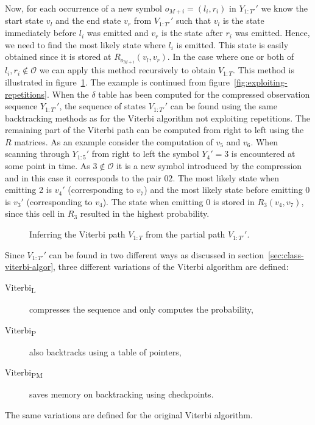 Now, for each occurrence of a new symbol $o_{M + i} = (l_i, r_i)$ in
$Y_{1:T'}'$ we know the start state $v_l$ and the end state $v_r$ from $V_{1:T'}'$
such that $v_l$ is the state immediately before $l_i$ was emitted and $v_r$ is
the state after $r_i$ was emitted. Hence, we need to find the most likely state
where $l_i$ is emitted. This state is easily obtained since it is stored at
$R_{o_{M + i}}(v_l, v_r)$. In the case where one or both of
$l_i, r_i \not \in \mathcal{O}$ we can apply this method recursively to obtain
$V_{1:T}$. This method is illustrated in
figure~\ref{fig:infering-viterbi-path}. The example is continued from
figure~\ref{fig:exploiting-repetitions}. When the $\delta$ table has been
computed for the compressed observation sequence $Y_{1:T'}'$, the sequence of
states $V_{1:T'}'$ can be found using the same backtracking methods as for the
Viterbi algorithm not exploiting repetitions. The remaining part of the Viterbi path can be
computed from right to left using the $R$ matrices. As an example consider the
computation of $v_5$ and $v_6$. When scanning through $Y_{1:5}'$ from right to
left the symbol $Y_4' = 3$ is encountered at some point in time. As
$3 \not \in \mathcal{O}$ it is a new symbol introduced by the compression and
in this case it corresponds to the pair $02$. The most likely state when
emitting 2 is $v_4'$ (corresponding to $v_7$) and the most likely state before
emitting 0 is $v_3'$ (corresponding to $v_4$). The state when emitting 0 is
stored in $R_3(v_4, v_7)$, since this cell in $R_3$ resulted in the highest
probability.

\begin{figure}
  \centering
  
  \caption{Inferring the Viterbi path $V_{1:T}$ from the partial path
    $V_{1:T'}'$. }
  \label{fig:infering-viterbi-path}
\end{figure}

Since $V_{1:T'}'$ can be found in two different ways as discussed in
section~\ref{sec:class-viterbi-algor}, three different variations of the Viterbi
algorithm are defined:
\begin{description}
\item[Viterbi\textsubscript{L}] compresses the sequence and only computes the
  probability,
\item[Viterbi\textsubscript{P}] also backtracks using a table of pointers,
\item[Viterbi\textsubscript{PM}] saves memory on backtracking using checkpoints.
\end{description}
The same variations are defined for the original Viterbi algorithm.

